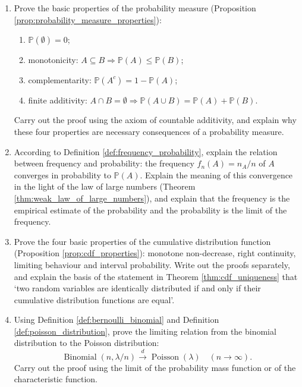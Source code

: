 \begin{enumerate}[leftmargin=3em, label=\textbf{Exercise \arabic*}]
    \item Prove the basic properties of the probability measure (Proposition \ref{prop:probability_measure_properties}):
    \begin{enumerate}[label=(\roman*)]
        \item $\mathbb{P}(\emptyset)=0$;
        \item monotonicity: $A\subseteq B\Rightarrow\mathbb{P}(A)\le\mathbb{P}(B)$;
        \item complementarity: $\mathbb{P}(A^c)=1-\mathbb{P}(A)$;
        \item finite additivity: $A\cap B=\emptyset\Rightarrow\mathbb{P}(A\cup B)=\mathbb{P}(A)+\mathbb{P}(B)$.
    \end{enumerate}
    Carry out the proof using the axiom of countable additivity, and explain why these four properties are necessary consequences of a probability measure.

    \item According to Definition \ref{def:frequency_probability}, explain the relation between frequency and probability:
    the frequency $f_n(A)=n_A/n$ of $A$ converges in probability to $\mathbb{P}(A)$.
    Explain the meaning of this convergence in the light of the law of large numbers (Theorem \ref{thm:weak_law_of_large_numbers}),
    and explain that the frequency is the empirical estimate of the probability and the probability is the limit of the frequency.

    \item Prove the four basic properties of the cumulative distribution function (Proposition \ref{prop:cdf_properties}):
    monotone non-decrease, right continuity, limiting behaviour and interval probability.
    Write out the proofs separately, and explain the basis of the statement in Theorem \ref{thm:cdf_uniqueness}
    that `two random variables are identically distributed if and only if their cumulative distribution functions are equal'.

    \item Using Definition \ref{def:bernoulli_binomial} and Definition \ref{def:poisson_distribution},
    prove the limiting relation from the binomial distribution to the Poisson distribution:
    \[
    \operatorname{Binomial}(n,\lambda/n)\xrightarrow{d}\operatorname{Poisson}(\lambda)
    \quad(n\to\infty).
    \]
    Carry out the proof using the limit of the probability mass function or of the characteristic function.


\end{enumerate}
